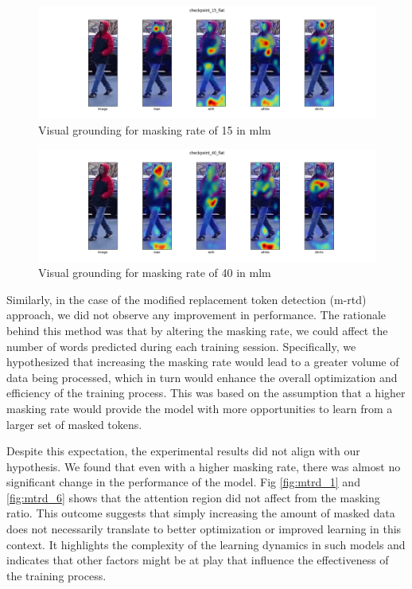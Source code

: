 \begin{figure}[htbp]
  \includegraphics[width=\linewidth]{img/mlm2/mlm-checkpoint_15_flat.png}
  \caption{Visual grounding for masking rate of 15 in \acrshort{mlm}}
  \label{fig:mlm_1}
\end{figure}

\begin{figure}[htbp]
  \includegraphics[width=\linewidth]{img/mlm2/mlm-checkpoint_40_flat.png}
  \caption{Visual grounding for masking rate of 40 in \acrshort{mlm}}
  \label{fig:mlm_6}
\end{figure}

Similarly, in the case of the modified replacement token detection (m-rtd) approach, we did not observe any improvement in performance. The rationale behind this method was that by altering the masking rate, we could affect the number of words predicted during each training session. Specifically, we hypothesized that increasing the masking rate would lead to a greater volume of data being processed, which in turn would enhance the overall optimization and efficiency of the training process. This was based on the assumption that a higher masking rate would provide the model with more opportunities to learn from a larger set of masked tokens.

Despite this expectation, the experimental results did not align with our hypothesis. We found that even with a higher masking rate, there was almost no significant change in the performance of the model. Fig \ref{fig:mtrd_1} and \ref{fig:mtrd_6} shows that the attention region did not affect from the masking ratio. This outcome suggests that simply increasing the amount of masked data does not necessarily translate to better optimization or improved learning in this context. It highlights the complexity of the learning dynamics in such models and indicates that other factors might be at play that influence the effectiveness of the training process.


